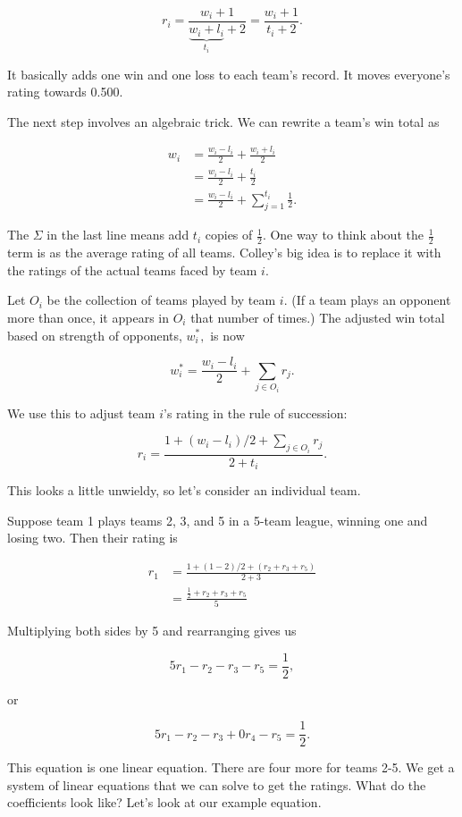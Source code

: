 \documentclass[
]{book}
\theoremstyle{definition}
\theoremstyle{definition}
\theoremstyle{definition}
\theoremstyle{definition}
\theoremstyle{remark}
\begin{document}
\[r_i=\frac{w_i+1}{\underbrace{w_i+l_i}_{t_i}+2}=\frac{w_i+1}{t_i+2}.\]

It basically adds one win and one loss to each team's record. It moves everyone's rating towards 0.500.

The next step involves an algebraic trick. We can rewrite a team's win total as

\begin{align*}
    w_i&=\frac{w_i-l_i}{2}+\frac{w_i+l_i}{2}\\
    &=\frac{w_i-l_i}{2}+\frac{t_i}{2}\\
    &=\frac{w_i-l_i}{2}+\sum_{j=1}^{t_i}\frac{1}{2}.
\end{align*}

The \(\Sigma\) in the last line means add \(t_i\) copies of \(\frac{1}{2}\). One way to think about the \(\frac{1}{2}\) term is as the average rating of all teams. Colley's big idea is to replace it with the ratings of the actual teams faced by team \(i\).

Let \(O_i\) be the collection of teams played by team \(i\). (If a team plays an opponent more than once, it appears in \(O_i\) that number of times.) The adjusted win total based on strength of opponents, \(w_i^*,\) is now

\[w^*_i=\frac{w_i-l_i}{2}+\sum_{j\in O_i}r_j.\]

We use this to adjust team \(i\)'s rating in the rule of succession:

\[r_i=\frac{1+(w_i-l_i)/2+\sum_{j\in O_i}r_j}{2+t_i}.\]

This looks a little unwieldy, so let's consider an individual team.

Suppose team 1 plays teams 2, 3, and 5 in a 5-team league, winning one and losing two. Then their rating is

\begin{align*} 
r_1&=\frac{1+(1-2)/2+(r_2+r_3+r_5)}{2+3}\\
&=\frac{\frac{1}{2}+r_2+r_3+r_5}{5}
\end{align*}

Multiplying both sides by 5 and rearranging gives us

\[5r_1-r_2-r_3-r_5=\frac{1}{2},\]

or

\[5r_1-r_2-r_3+0r_4-r_5=\frac{1}{2}.\]

This equation is one linear equation. There are four more for teams 2-5. We get a system of linear equations that we can solve to get the ratings. What do the coefficients look like? Let's look at our example equation.
\end{document}
